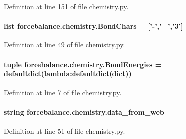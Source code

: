 Definition at line 151 of file chemistry.\-py.

\hypertarget{namespaceforcebalance_1_1chemistry_ac5fcb01c4de1456a654dd920150069f3}{
\paragraph[{Bond\-Chars}]{\setlength{\rightskip}{0pt plus 5cm}list forcebalance.\-chemistry.\-Bond\-Chars = \mbox{[}'-\/','=','3'\mbox{]}}}\label{namespaceforcebalance_1_1chemistry_ac5fcb01c4de1456a654dd920150069f3}


Definition at line 49 of file chemistry.\-py.

\hypertarget{namespaceforcebalance_1_1chemistry_aa5baf093f9cb069966eae63492327221}{
\paragraph[{Bond\-Energies}]{\setlength{\rightskip}{0pt plus 5cm}tuple forcebalance.\-chemistry.\-Bond\-Energies = defaultdict(lambda\-:defaultdict(dict))}}\label{namespaceforcebalance_1_1chemistry_aa5baf093f9cb069966eae63492327221}


Definition at line 7 of file chemistry.\-py.

\hypertarget{namespaceforcebalance_1_1chemistry_a4080110f15046bfd2f27bbb60ba2ef66}{
\paragraph[{data\-\_\-from\-\_\-web}]{\setlength{\rightskip}{0pt plus 5cm}string forcebalance.\-chemistry.\-data\-\_\-from\-\_\-web}}\label{namespaceforcebalance_1_1chemistry_a4080110f15046bfd2f27bbb60ba2ef66}


Definition at line 51 of file chemistry.\-py.

